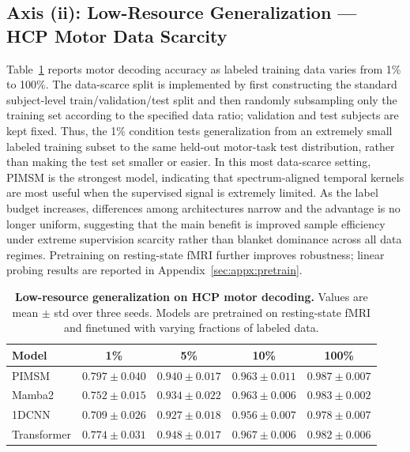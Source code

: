 \documentclass{article}
\begin{document}
\subsection{Axis (ii): Low-Resource Generalization — HCP Motor Data Scarcity}
\label{sec:results:data_scarce}

Table~\ref{tab:data_scarce} reports motor decoding accuracy as labeled training data varies from 1\% to 100\%.
The data-scarce split is implemented by first constructing the standard subject-level train/validation/test split and then randomly subsampling only the training set according to the specified data ratio; validation and test subjects are kept fixed.
Thus, the 1\% condition tests generalization from an extremely small labeled training subset to the same held-out motor-task test distribution, rather than making the test set smaller or easier.
In this most data-scarce setting, PIMSM is the strongest model, indicating that spectrum-aligned temporal kernels are most useful when the supervised signal is extremely limited.
As the label budget increases, differences among architectures narrow and the advantage is no longer uniform, suggesting that the main benefit is improved sample efficiency under extreme supervision scarcity rather than blanket dominance across all data regimes.
Pretraining on resting-state fMRI further improves robustness; linear probing results are reported in Appendix~\ref{sec:appx:pretrain}.

\begin{table}[htbp]
\centering
\footnotesize
\begin{tabular}{lcccc}
\toprule
Model & 1\% & 5\% & 10\% & 100\% \\
\midrule
PIMSM & $\mathbf{0.797\pm0.040}$ & $0.940\pm0.017$ & $0.963\pm0.011$ & $\mathbf{0.987\pm0.007}$ \\
Mamba2 & $0.752\pm0.015$ & $0.934\pm0.022$ & $0.963\pm0.006$ & $0.983\pm0.002$ \\
1DCNN & $0.709\pm0.026$ & $0.927\pm0.018$ & $0.956\pm0.007$ & $0.978\pm0.007$ \\
Transformer & $0.774\pm0.031$ & $\mathbf{0.948\pm0.017}$ & $\mathbf{0.967\pm0.006}$ & $0.982\pm0.006$ \\
\bottomrule
\end{tabular}
\caption{
\textbf{Low-resource generalization on HCP motor decoding.}
Values are mean $\pm$ std over three seeds. Models are pretrained on resting-state fMRI and finetuned with varying fractions of labeled data.
}
\label{tab:data_scarce}
\end{table}
\end{document}
